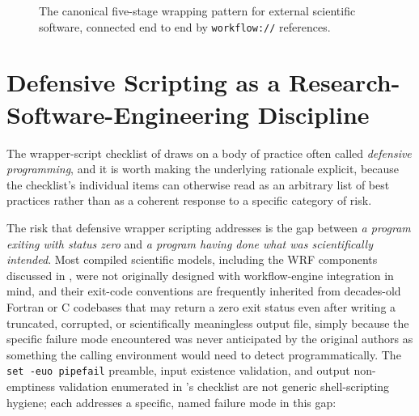 \begin{figure}[h]
\centering
{}
\caption{The canonical five-stage wrapping pattern for external scientific
software, connected end to end by \texttt{workflow://} references.}
\label{fig:five-stage-pattern}
\end{figure}

\section{Defensive Scripting as a Research-Software-Engineering Discipline}

The wrapper-script checklist of  draws on a body
of practice often called \emph{defensive programming}, and it is worth
making the underlying rationale explicit, because the checklist's individual
items can otherwise read as an arbitrary list of best practices rather than
as a coherent response to a specific category of risk.

The risk that defensive wrapper scripting addresses is the gap between
\emph{a program exiting with status zero} and \emph{a program having done
what was scientifically intended}. Most compiled scientific models,
including the WRF components discussed in , were not
originally designed with workflow-engine integration in mind, and their
exit-code conventions are frequently inherited from decades-old Fortran or C
codebases that may return a zero exit status even after writing a truncated,
corrupted, or scientifically meaningless output file, simply because the
specific failure mode encountered was never anticipated by the original
authors as something the calling environment would need to detect
programmatically. The \texttt{set -euo pipefail} preamble, input
existence validation, and output non-emptiness validation enumerated in
's checklist are not generic shell-scripting
hygiene; each addresses a specific, named failure mode in this gap:

